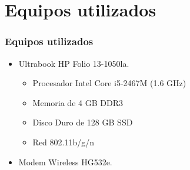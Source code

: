 \section{Equipos utilizados}
  \begin{frame}
    \frametitle{Equipos utilizados}
    \begin{itemize}
      \item Ultrabook HP Folio 13-1050la.
      \begin{itemize}
        \item Procesador Intel Core i5-2467M (1.6 GHz)
        \item Memoria de 4 GB DDR3
        \item Disco Duro de 128 GB SSD
        \item Red 802.11b/g/n
      \end{itemize}
      \item Modem Wireless  HG532e. 
    \end{itemize}
  \end{frame}
